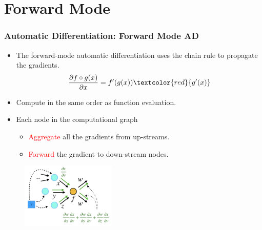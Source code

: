 \documentclass{beamer}
\newcommand{\red}[1]{\textcolor{red}{#1}}
\begin{document}
\section{Forward Mode}



\begin{frame}
	\frametitle{Automatic Differentiation: Forward Mode AD}

	\begin{itemize}
	\item The forward-mode automatic differentiation uses the chain rule to propagate the gradients. 
	$$\frac{\partial f\circ g (x)}{\partial x} =  f'(g(x)) \red{ g'(x)}$$
		\item Compute in the same order as function evaluation. 
		\item Each node in the computational graph
		\begin{itemize}
		\item \red{Aggregate} all the gradients from up-streams. 
		\item \red{Forward} the gradient to down-stream nodes.  
		\end{itemize} 
	\end{itemize}
	
	\begin{figure}[hbt]
  \includegraphics[width=0.4\textwidth]{figures/fad}
\end{figure}
	
	
\end{frame}
\end{document}
